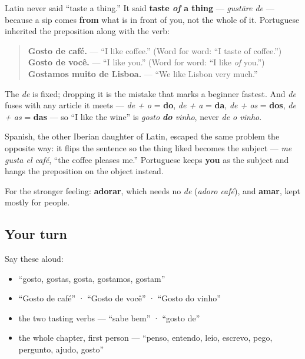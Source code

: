 \begin{grammarlens}[title={Grammar Lens: why the \emph{de} is not optional}]
Latin never said \textquotedblleft{}taste a thing.\textquotedblright{} It said \textbf{taste \emph{of} a thing} — \emph{gustāre de} — because a sip comes \textbf{from} what is in front of you, not the whole of it. Portuguese inherited the preposition along with the verb:

\begin{quote}
\textbf{Gosto de café.} — \textquotedblleft{}I like coffee.\textquotedblright{} (Word for word: \textquotedblleft{}I taste of coffee.\textquotedblright{}) \textbf{Gosto de você.} — \textquotedblleft{}I like you.\textquotedblright{} (Word for word: \textquotedblleft{}I like \emph{of} you.\textquotedblright{}) \textbf{Gostamos muito de Lisboa.} — \textquotedblleft{}We like Lisbon very much.\textquotedblright{}
\end{quote}

The \emph{de} is fixed; dropping it is the mistake that marks a beginner fastest. And \emph{de} fuses with any article it meets — \emph{de + o} = \textbf{do}, \emph{de + a} = \textbf{da}, \emph{de + os} = \textbf{dos}, \emph{de + as} = \textbf{das} — so \textquotedblleft{}I like the wine\textquotedblright{} is \emph{gosto \textbf{do} vinho}, never \emph{de o vinho}.

Spanish, the other Iberian daughter of Latin, escaped the same problem the opposite way: it flips the sentence so the thing liked becomes the subject — \emph{me gusta el café}, \textquotedblleft{}the coffee pleases me.\textquotedblright{} Portuguese keeps \textbf{you} as the subject and hangs the preposition on the object instead.

For the stronger feeling: \textbf{adorar}, which needs no \emph{de} (\emph{adoro café}), and \textbf{amar}, kept mostly for people.
\end{grammarlens}

\subsection*{Your turn}
Say these aloud:

\begin{itemize}
\raggedright
  \item \textquotedblleft{}gosto, gostas, gosta, gostamos, gostam\textquotedblright{}
  \item \textquotedblleft{}Gosto de café\textquotedblright{} · \textquotedblleft{}Gosto de você\textquotedblright{} · \textquotedblleft{}Gosto do vinho\textquotedblright{}
  \item the two tasting verbs — \textquotedblleft{}sabe bem\textquotedblright{} · \textquotedblleft{}gosto de\textquotedblright{}
  \item the whole chapter, first person — \textquotedblleft{}penso, entendo, leio, escrevo, pego, pergunto, ajudo, gosto\textquotedblright{}
\end{itemize}


